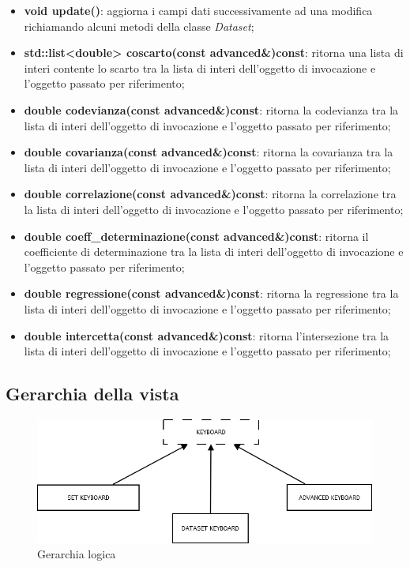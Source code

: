 \documentclass[a4paper,10pt]{article}
\begin{document}
    \begin{itemize}
        \item \textbf{void update()}: aggiorna i campi dati successivamente ad una modifica richiamando alcuni metodi della classe \textit{Dataset};
        \item \textbf{std::list<double> coscarto(const advanced\&)const}: ritorna una lista di interi contente lo scarto tra la lista di interi dell'oggetto di invocazione e l'oggetto passato per riferimento;
        \item \textbf{double codevianza(const advanced\&)const}: ritorna la codevianza tra la lista di interi dell'oggetto di invocazione e l'oggetto passato per riferimento;
        \item \textbf{double covarianza(const advanced\&)const}: ritorna la covarianza tra la lista di interi dell'oggetto di invocazione e l'oggetto passato per riferimento;
        \item \textbf{double correlazione(const advanced\&)const}: ritorna la correlazione tra la lista di interi dell'oggetto di invocazione e l'oggetto passato per riferimento;
        \item \textbf{double coeff\_determinazione(const advanced\&)const}: ritorna il coefficiente di determinazione tra la lista di interi dell'oggetto di invocazione e l'oggetto passato per riferimento;
        \item \textbf{double regressione(const advanced\&)const}: ritorna la regressione tra la lista di interi dell'oggetto di invocazione e l'oggetto passato per riferimento;
        \item \textbf{double intercetta(const advanced\&)const}: ritorna l'intersezione tra la lista di interi dell'oggetto di invocazione e l'oggetto passato per riferimento;
    \end{itemize}

    \subsection{Gerarchia della vista}
    \begin{figure}[!h]
		\begin{center} \includegraphics[scale=0.5]{img/Diagramma2.png}
			\caption{Gerarchia logica}
		\end{center}
	\end{figure}
\end{document}
